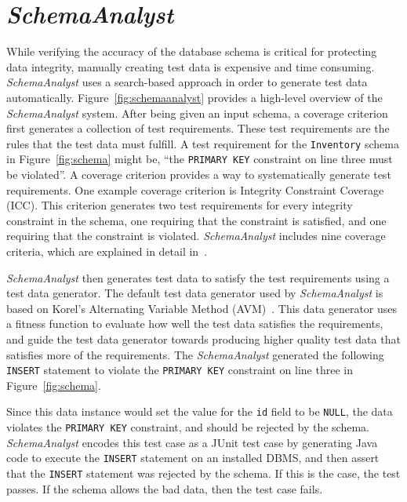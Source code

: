 \section{\textit{SchemaAnalyst}}

While verifying the accuracy of the database schema is critical for protecting data integrity, manually
creating test data is expensive and time consuming. \textit{SchemaAnalyst} uses a search-based
approach in order to generate test data automatically. Figure~\ref{fig:schemaanalyst} provides a
high-level overview of the \textit{SchemaAnalyst} system.
After being given an input schema, a coverage criterion first generates a collection of test 
requirements. These test requirements are the rules that
the test data must fulfill. A test requirement for the \texttt{Inventory} schema in
Figure~\ref{fig:schema} might be, ``the \texttt{PRIMARY KEY} constraint on line three must be
violated''. A coverage criterion provides a way to systematically generate test requirements. One
example coverage criterion is Integrity Constraint Coverage (ICC). This criterion generates two test
requirements for every integrity constraint in the schema, one requiring that the constraint is
satisfied, and one requiring that the constraint is violated. \textit{SchemaAnalyst} includes nine
coverage criteria, which are explained in detail in~\cite{mcminn2015effectiveness}.

\textit{SchemaAnalyst} then generates test data
to satisfy the test requirements using a test data generator. The default test data generator used by
\textit{SchemaAnalyst} is based on Korel's Alternating Variable Method (AVM)~\cite{Korel:AVM}.
This data generator uses a fitness function to evaluate how well the test data satisfies the
requirements, and guide the test data generator towards producing higher quality test data that
satisfies more of the requirements. The \textit{SchemaAnalyst} generated the following \texttt{INSERT}
statement to violate the \texttt{PRIMARY KEY} constraint on line three in Figure~\ref{fig:schema}.



Since this data instance would set the value for the \texttt{id} field to be \texttt{NULL},
the data violates the \texttt{PRIMARY KEY} constraint, and should be rejected by the schema.
\textit{SchemaAnalyst} encodes this test case as a JUnit test case by generating Java code to execute
the \texttt{INSERT} statement on an installed DBMS, and then assert that the \texttt{INSERT} statement
was rejected by the schema. If this is the case, the test passes.  If the schema allows the bad data,
then the test case fails.

